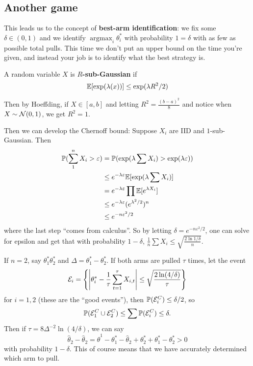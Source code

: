 \documentclass[12pt]{article}
\DeclareMathOperator*{\argmax}{argmax}
\begin{document}
\subsection{Another game}
This leads us to the concept of \textbf{best-arm identification}: we fix some $\delta\in(0,1)$ and we identify $\argmax_i\theta_i^\ast$ with probability $1=\delta$ with as few as possible total pulls.
This time we don't put an upper bound on the time you're given, and instead your job is to identify what the best strategy is.

\begin{defn}
	A random variable $X$ is \textbf{$R$-sub-Gaussian} if 
	\[\mathbb{E}[\exp(\lambda(x))]\le\exp(\lambda R^2/2)\]
\end{defn}
\begin{rmk}
	Then by Hoeffding, if $X\in[a,b]$  and letting $R^2=\frac{(b-a)^2}{8}$ and notice when $X\sim \mathcal{N}(0,1)$, we get $R^2=1$.
\end{rmk}

Then we can develop the Chernoff bound: Suppose $X_i$ are IID and $1$-sub-Gaussian. Then 
\begin{align*}
	\mathbb{P}(\sum_1^n X_i >\varepsilon)&=\mathbb{P}(\exp(\lambda\sum X_i) >\exp(\lambda\varepsilon))\\
	&\le e^{-\lambda\varepsilon}\mathbb{E}[\exp(\lambda\sum X_i)]\\
	&= e^{-\lambda\varepsilon}\prod\mathbb{E}[e^{\lambda X_i}]\\
	&\le e^{-\lambda\varepsilon}(e^{\lambda^2/2})^n\\
	&\le e^{-n\varepsilon^2/2}
\end{align*}
where the last step ``comes from calculus''. So by letting $\delta=e^{-n\varepsilon^2/2}$, one can solve for epsilon
and get that with probability $1-\delta$, $\frac{1}{n}\sum X_i\le\sqrt{\frac{2\ln 1/\delta}{n}}$.

If $n=2$, say $\theta_1^\ast\theta_2^\ast$ and $\Delta=\theta_1^\ast-\theta_2^\ast$. If both arms are pulled $\tau$ times, let the event
\[\mathcal{E}_i=\left\{\left|\theta_i^\ast-\frac{1}{\tau}\sum_{t=1}^\tau X_{i,t}\right|\le\sqrt{\frac{2\ln (4/\delta)}{\tau}}\right\}\]
for $i=1,2$ (these are the ``good events''), then $\mathbb{P}(\mathcal{E}_i^C)\le\delta/2$, so 
\[\mathbb{P}(\mathcal{E}_1^C\cup\mathcal{E}_2^C)\le\sum\mathbb{P}(\mathcal{E}_i^C)\le\delta.\]
Then if $\tau=8\Delta^{-2}\ln(4/\delta)$, we can say 
\[\hat\theta_2-\hat\theta_2=\hat\theta^1-\theta_1^\ast-\hat\theta_2+\theta_2^\ast+\theta_1^\ast-\theta_2^\ast>0\]
with probability $1-\delta$. This of course means that we have accurately determined which arm to pull.
\end{document}
